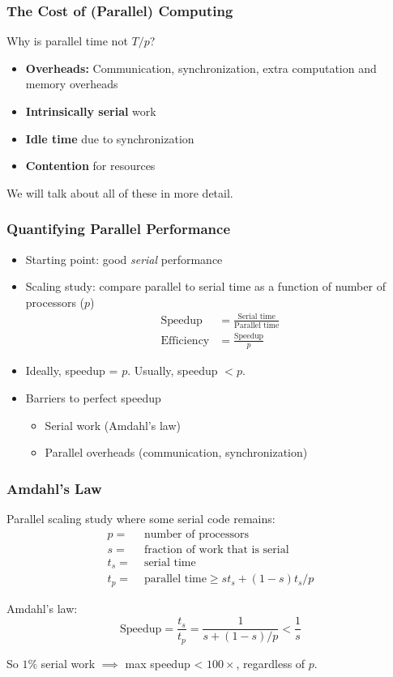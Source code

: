 \documentclass{beamer}
\begin{document}
\begin{frame}
  \frametitle{The Cost of (Parallel) Computing}

  Why is parallel time not $T/p$?
  \begin{itemize}
  \item {\bf Overheads:} Communication, synchronization, extra
    computation and memory overheads
  \item {\bf Intrinsically serial} work
  \item {\bf Idle time} due to synchronization
  \item {\bf Contention} for resources
  \end{itemize}
  We will talk about all of these in more detail.
  
\end{frame}


\begin{frame}
  \frametitle{Quantifying Parallel Performance}
  
  \begin{itemize}
  \item Starting point: good {\em serial} performance
  \item Scaling study: compare parallel to serial time as a function of number of processors ($p$)
    \begin{align*}
      \mbox{Speedup} &= \frac{\mbox{Serial time}}{\mbox{Parallel time}} \\[2mm]
      \mbox{Efficiency} &= \frac{\mbox{Speedup}}{p}
    \end{align*}
  \item
    Ideally, speedup = $p$.  
    Usually, speedup $ < p$.
  \item Barriers to perfect speedup
    \begin{itemize}
    \item Serial work (Amdahl's law)
    \item Parallel overheads (communication, synchronization)
    \end{itemize}
  \end{itemize}
\end{frame}


\begin{frame}
  \frametitle{Amdahl's Law}

  Parallel scaling study where some serial code remains:
  \begin{align*}
    p = & \mbox{ number of processors} \\
    s = & \mbox{ fraction of work that is serial} \\
    t_s = & \mbox{ serial time} \\
    t_p = & \mbox{ parallel time} \geq s t_s + (1-s) t_s / p
  \end{align*}

  \vspace{2mm}
  Amdahl's law:
  \[
    \mbox{Speedup} = 
      \frac{t_s}{t_p} = \frac{1}{s + (1-s) / p} < \frac{1}{s}
  \]

  \vspace{5mm}
  So $1\%$ serial work $\implies$ max speedup < $100 \times$,
  regardless of $p$.
\end{frame}
\end{document}
